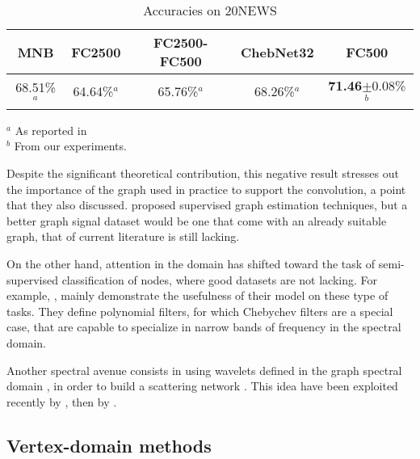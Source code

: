 \begin{table}[H]
  \caption{Accuracies on 20NEWS}
  \begin{center}
    \bgroup
    \def\arraystretch{1.5}%
    \begin{tabular}{|c|c|c|c|c|}
      \hline
      MNB & FC2500 & FC2500-FC500 & ChebNet32 & FC500\\
      \hline
      68.51\%$^a$ & 64.64\%$^a$ & 65.76\%$^a$ & 68.26\%$^a$ & \textbf{71.46}$\pm$0.08\%$^b$\\
      \hline
    \end{tabular}
    \egroup
  \end{center}
\begin{flushleft}
\footnotesize{
$^a$ As reported in \cite{defferrard2016convolutional}\\
$^b$ From our experiments.
}
\end{flushleft}
  \label{tab:20}
\end{table}

Despite the significant theoretical contribution, this negative result stresses out the importance of the graph used in practice to support the convolution, a point that they also discussed. \cite{henaff2015deep} proposed supervised graph estimation techniques, but a better graph signal dataset would be one that come with an already suitable graph, that of current literature is still lacking.

On the other hand, attention in the domain has shifted toward the task of semi-supervised classification of nodes, where good datasets are not lacking. For example, \cite{levie2017cayleynets}, mainly demonstrate the usefulness of their model on these type of tasks. They define polynomial filters, for which Chebychev filters are a special case, that are capable to specialize in narrow bands of frequency in the spectral domain.

Another spectral avenue consists in using wavelets defined in the graph spectral domain \citep{hammond2011wavelets}, in order to build a scattering network \citep{bruna2013invariant,chen2014unsupervised}. This idea have been exploited recently by \cite{zou2018Graph}, then by \cite{gama2018Diffusion}.

\subsection{Vertex-domain methods}
\label{sec:vert}

